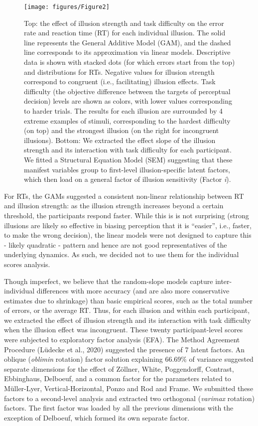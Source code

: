 \documentclass[
  man,floatsintext]{apa6}
\begin{document}
\begin{figure}
\texttt{[image: figures/Figure2]} \caption{Top: the effect of illusion strength and task difficulty on the error rate and reaction time (RT) for each individual illusion. The solid line represents the General Additive Model (GAM), and the dashed line corresponds to its approximation via linear models. Descriptive data is shown with stacked dots (for which errors start from the top) and distributions for RTs. Negative values for illusion strength correspond to congruent (i.e., facilitating) illusion effects. Task difficulty (the objective difference between the targets of perceptual decision) levels are shown as colors, with lower values corresponding to harder trials. The results for each illusion are surrounded by 4 extreme examples of stimuli, corresponding to the hardest difficulty (on top) and the strongest illusion (on the right for incongruent illusions). Bottom: We extracted the effect slope of the illusion strength and its interaction with task difficulty for each participant. We fitted a Structural Equation Model (SEM) suggesting that these manifest variables group to first-level illusion-specific latent factors, which then load on a general factor of illusion sensitivity (Factor \textit{i}).}\label{fig:unnamed-chunk-3}
\end{figure}

For RTs, the GAMs suggested a consistent non-linear relationship between RT and illusion strength: as the illusion strength increases beyond a certain threshold, the participants respond faster. While this is is not surprising (strong illusions are likely so effective in biasing perception that it is ``easier'', i.e., faster, to make the wrong decision), the linear models were not designed to capture this - likely quadratic - pattern and hence are not good representatives of the underlying dynamics. As such, we decided not to use them for the individual scores analysis.

Though imperfect, we believe that the random-slope models capture inter-individual differences with more accuracy (and are also more conservative estimates due to shrinkage) than basic empirical scores, such as the total number of errors, or the average RT. Thus, for each illusion and within each participant, we extracted the effect of illusion strength and its interaction with task difficulty when the illusion effect was incongruent. These twenty participant-level scores were subjected to exploratory factor analysis (EFA). The Method Agreement Procedure (Lüdecke et al., 2020) suggested the presence of 7 latent factors. An oblique (\emph{oblimin} rotation) factor solution explaining 66.69\% of variance suggested separate dimensions for the effect of Zöllner, White, Poggendorff, Contrast, Ebbinghaus, Delboeuf, and a common factor for the parameters related to Müller-Lyer, Vertical-Horizontal, Ponzo and Rod and Frame. We submitted these factors to a second-level analysis and extracted two orthogonal (\emph{varimax} rotation) factors. The first factor was loaded by all the previous dimensions with the exception of Delboeuf, which formed its own separate factor.
\end{document}
